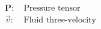 \documentclass[10pt]{article}
\begin{document}
\begin{align*}\boldsymbol{P}:&\ \text{Pressure tensor}\\
\overrightarrow{v}:&\ \text{Fluid three-velocity}
\end{align*}
\end{document}
